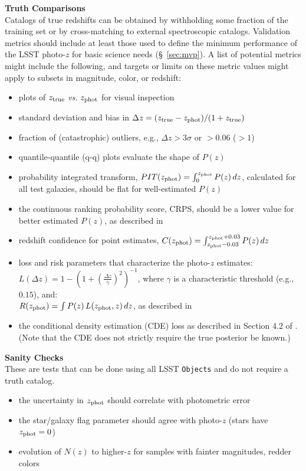 \documentclass[DM,lsstdraft,toc]{lsstdoc}
\begin{document}
{\bf Truth Comparisons}\\
Catalogs of true redshifts can be obtained by withholding some fraction of the training set or by cross-matching to external spectroscopic catalogs. Validation metrics should include at least those used to define the minimum performance of the LSST photo-$z$ for basic science needs (\S~\ref{sec:mvp}). A list of potential metrics might include the following, and targets or limits on these metric values might apply to subsets in magnitude, color, or redshift: 
\vspace{-15pt}
\begin{itemize}
\item plots of $z_{\rm true}$ {\it vs.} $z_{\rm phot}$ for visual inspection
\item standard deviation and bias in $\Delta z = (z_{\rm true}-z_{\rm phot})/(1+z_{\rm true})$
\item fraction of (catastrophic) outliers, e.g., $\Delta z > 3\sigma$ or $>0.06$ ($>1$)
\item quantile-quantile (q-q) plots evaluate the shape of $P(z)$
\item probability integrated transform, $PIT(z_{\rm phot}) = \int_{0}^{z_{\rm phot}} P(z)\,dz$, calculated for all test galaxies, should be flat for well-estimated $P(z)$ \citep{2016arXiv160808016P}
\item the continuous ranking probability score, CRPS, should be a lower value for better estimated $P(z)$, as described in \citep{2016arXiv160808016P}
\item redshift confidence for point estimates, $C(z_{\rm phot}) = \int_{z_{\rm phot}-0.03}^{z_{\rm phot}+0.03} P(z)\,dz $
\item loss and risk parameters that characterize the photo-$z$ estimates:\\
$L(\Delta z) = 1 - \left(1+ \left(\frac{\Delta z}{\gamma} \right)^2 \right)^{-1}$, 
where $\gamma$ is a characteristic threshold (e.g., $0.15$), and:\\
$R(z_{\rm phot}) = \int P(z)\,L(z_{\rm phot},z)\,dz$, as described in \citet{2018PASJ...70S...9T}
\item the conditional density estimation (CDE) loss as described in Section 4.2 of \citet{2020arXiv200103621S}. (Note that the CDE does not strictly require the true posterior be known.)
\end{itemize}

{\bf Sanity Checks}\\
These are tests that can be done using all LSST {\tt Objects} and do not require a truth catalog.
\vspace{-15pt}
\begin{itemize}
\item the uncertainty in $z_{\rm phot}$ should correlate with photometric error
\item the star/galaxy flag parameter should agree with photo-$z$ (stars have $z_{\rm phot}=0$)
\item evolution of $N(z)$ to higher-$z$ for samples with fainter magnitudes, redder colors
\end{itemize}
\end{document}
